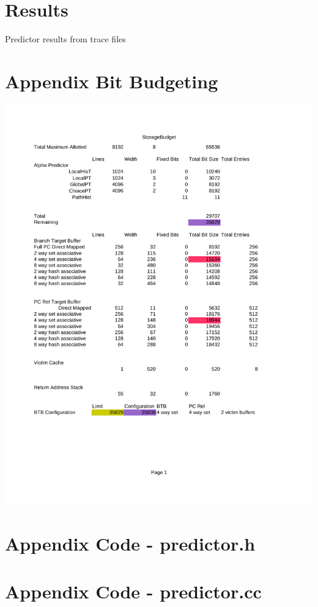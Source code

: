 \documentclass[twocolumn]{article}
\begin{document}










\onecolumn
\section{Results}
Predictor results from trace files

\section{Appendix Bit Budgeting}
\includegraphics[width=16cm]{BitBudget}
\section{Appendix Code - predictor.h}

\section{Appendix Code - predictor.cc}

\end{document}
